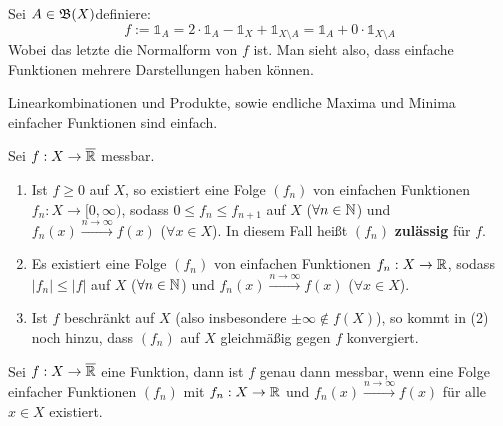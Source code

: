 \documentclass[a4paper,twoside,DIV15,BCOR12mm,chapterprefix=true,headings=onelinechapter]{scrbook}
\begin{document}
\begin{beispiel}
Sei $A\in\mathfrak{B}(X)$definiere:
\[f:=\mathds{1}_A=2\cdot\mathds{1}_A-\mathds{1}_X+\mathds{1}_{X\setminus A}=\mathds{1}_A+0\cdot\mathds{1}_{X\setminus A}\]
Wobei das letzte die Normalform von $f$ ist. Man sieht also, dass einfache Funktionen mehrere Darstellungen haben können.
\end{beispiel}

\begin{satz}
\label{Satz 3.7}
Linearkombinationen und Produkte, sowie endliche Maxima und Minima einfacher Funktionen sind einfach.
\end{satz}

\begin{satz}
\label{Satz 3.8}
Sei $f:X\to\overline{\mathbb{R}}$ messbar.
\begin{enumerate}
\item Ist $f\ge 0$ auf $X$, so existiert eine Folge $(f_n)$ von einfachen Funktionen $f_n:X\to[0,\infty)$, sodass $0\le f_n\le f_{n+1}$ auf $X$ ($\forall n\in\mathbb{N}$) und $f_n(x)\stackrel{n\to\infty}{\to}f(x)$ ($\forall x\in X$). In diesem Fall heißt $(f_n)$ \textbf{zulässig} für $f$.
\item Es existiert eine Folge $(f_n)$ von einfachen Funktionen $f_n:X\to\mathbb{R}$, sodass $|f_n|\le |f|$ auf $X$ ($\forall n\in\mathbb{N}$) und $f_n(x)\stackrel{n\to\infty}{\to}f(x)$ ($\forall x\in X$).
\item Ist $f$ beschränkt auf $X$ (also insbesondere $\pm\infty\not\in f(X)$), so kommt in (2) noch hinzu, dass $(f_n)$ auf $X$ gleichmäßig gegen $f$ konvergiert.
\end{enumerate}
\end{satz}

\begin{folgerungen}
Sei $f:X\to\overline{\mathbb{R}}$ eine Funktion, dann ist $f$ genau dann messbar, wenn eine Folge einfacher Funktionen $(f_n)$ mit $f_n:X\to\mathbb{R}$ und $f_n(x)\stackrel{n\to\infty}\to f(x)$ für alle $x\in X$ existiert.
\end{folgerungen}
\end{document}
